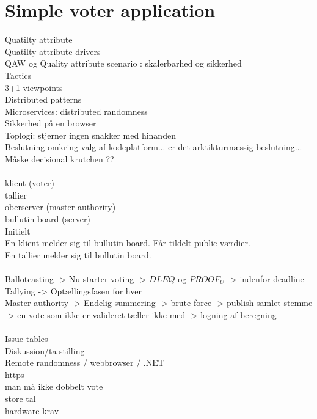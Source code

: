 \section{Simple voter application}


\noindent
Quatilty attribute\\
Quatilty attribute drivers\\
QAW og Quality attribute scenario : skalerbarhed og sikkerhed\\
Tactics\\
3+1 viewpoints\\
Distributed patterns\\
Microservices: distributed randomness\\
Sikkerhed på en browser\\
Toplogi: stjerner ingen snakker med hinanden\\
Beslutning omkring valg af kodeplatform... er det arktikturmæssig beslutning... Måske decisional krutchen ??\\\\

\noindent
klient (voter)\\
tallier\\
oberserver (master authority)\\
bullutin board (server)\\
\noindent
Initielt\\
En klient melder sig til bullutin board. Får tildelt public værdier. \\
En tallier melder sig til bullutin board. \\\\
\noindent
Ballotcasting -> Nu starter voting ->  $DLEQ$ og $PROOF_U$ -> indenfor deadline\\
Tallying -> Optællingsfasen for hver \\
Master authority -> Endelig summering -> brute force -> publish samlet stemme -> en vote som ikke er valideret tæller ikke med -> logning af beregning \\\\

\noindent
Issue tables\\
Diskussion/ta stilling \\
Remote randomness / webbrowser / .NET\\
https\\
man må ikke dobbelt vote\\
store tal\\
hardware krav
